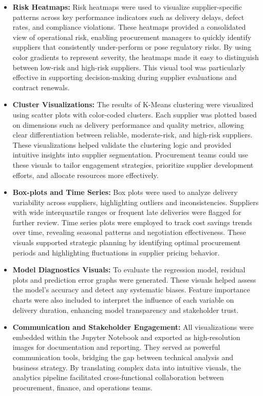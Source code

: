 \documentclass[10pt, twocolumn]{article}
\begin{document}
\begin{itemize}
    \item \textbf{Risk Heatmaps:} Risk heatmaps were used to visualize supplier-specific patterns across key performance indicators such as delivery delays, defect rates, and compliance violations. These heatmaps provided a consolidated view of operational risk, enabling procurement managers to quickly identify suppliers that consistently under-perform or pose regulatory risks. By using color gradients to represent severity, the heatmaps made it easy to distinguish between low-risk and high-risk suppliers. This visual tool was particularly effective in supporting decision-making during supplier evaluations and contract renewals.

    \item \textbf{Cluster Visualizations:} The results of K-Means clustering were visualized using scatter plots with color-coded clusters. Each supplier was plotted based on dimensions such as delivery performance and quality metrics, allowing clear differentiation between reliable, moderate-risk, and high-risk suppliers. These visualizations helped validate the clustering logic and provided intuitive insights into supplier segmentation. Procurement teams could use these visuals to tailor engagement strategies, prioritize supplier development efforts, and allocate resources more effectively.

    \item \textbf{Box-plots and Time Series:} Box plots were used to analyze delivery variability across suppliers, highlighting outliers and inconsistencies. Suppliers with wide interquartile ranges or frequent late deliveries were flagged for further review. Time series plots were employed to track cost savings trends over time, revealing seasonal patterns and negotiation effectiveness. These visuals supported strategic planning by identifying optimal procurement periods and highlighting fluctuations in supplier pricing behavior.

    \item \textbf{Model Diagnostics Visuals:} To evaluate the regression model, residual plots and prediction error graphs were generated. These visuals helped assess the model’s accuracy and detect any systematic biases. Feature importance charts were also included to interpret the influence of each variable on delivery duration, enhancing model transparency and stakeholder trust.

    \item \textbf{Communication and Stakeholder Engagement:} All visualizations were embedded within the Jupyter Notebook and exported as high-resolution images for documentation and reporting. They served as powerful communication tools, bridging the gap between technical analysis and business strategy. By translating complex data into intuitive visuals, the analytics pipeline facilitated cross-functional collaboration between procurement, finance, and operations teams.
\end{itemize}
\end{document}
